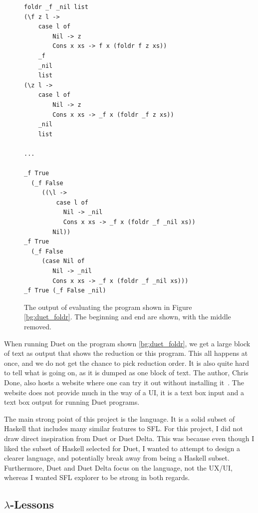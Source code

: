 \begin{figure}[h]
    \centering
    \begin{lstlisting}[language=SFL]
foldr _f _nil list
(\f z l ->
    case l of
        Nil -> z
        Cons x xs -> f x (foldr f z xs))
    _f
    _nil
    list
(\z l ->
    case l of
        Nil -> z
        Cons x xs -> _f x (foldr _f z xs))
    _nil
    list

... 

_f True
  (_f False
     ((\l ->
         case l of
           Nil -> _nil
           Cons x xs -> _f x (foldr _f _nil xs))
        Nil))
_f True
  (_f False
     (case Nil of
        Nil -> _nil
        Cons x xs -> _f x (foldr _f _nil xs)))
_f True (_f False _nil)
\end{lstlisting}

    \caption{The output of evaluating the program shown in Figure \ref{bg:duet_foldr}. The beginning and end are shown, with the middle removed. }
    \label{bg:duet_foldr_eval}
\end{figure}

\noindent When running Duet \cite{duet_hackage} on the program shown \ref{bg:duet_foldr}, we get a large block of text as output that shows the reduction or this program. This all happens at once, and we do not get the chance to pick reduction order. It is also quite hard to tell what is going on, as it is dumped as one block of text. The author, Chris Done, also hosts a website where one can try it out without installing it~\cite{duet_delta}. The website does not provide much in the way of a UI, it is a text box input and a text box output for running Duet programs.

\noindent The main strong point of this project is the language. It is a solid subset of Haskell that includes many similar features to SFL. For this project, I did not draw direct inspiration from Duet or Duet Delta. This was because even though I liked the subset of Haskell selected for Duet, I wanted to attempt to design a clearer language, and potentially break away from being a Haskell subset. Furthermore, Duet and Duet Delta focus on the language, not the UX/UI, whereas I wanted SFL explorer to be strong in both regards. 

\subsection{$\lambda$-Lessons}
\newcommand{\llessons}{$\lambda$-Lessons}
\label{bg:llessons}

